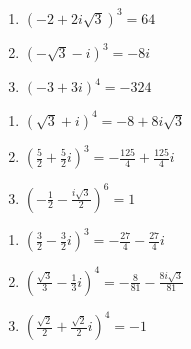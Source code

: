 \begin{multicols}{3}

\begin{enumerate}

\setcounter{enumi}{\value{HW}}

\item $\left(-2 + 2i\sqrt{3}\right)^3 = 64$
\item $(-\sqrt{3} - i)^3 =-8i$
\item $(-3+3i)^{4}=-324$

\setcounter{HW}{\value{enumi}}

\end{enumerate}

\end{multicols}

\begin{multicols}{3}

\begin{enumerate}

\setcounter{enumi}{\value{HW}}

\item $(\sqrt{3} + i)^4 =-8 + 8i\sqrt{3}$ 
\item $\left(\frac{5}{2} + \frac{5}{2} i\right)^3=-\frac{125}{4}+\frac{125}{4} i$ 
\item $\left(-\frac{1}{2} - \frac{i \sqrt{3}}{2}\right)^{6}=1$

\setcounter{HW}{\value{enumi}}

\end{enumerate}

\end{multicols}

\begin{multicols}{3}

\begin{enumerate}

\setcounter{enumi}{\value{HW}}

\item $\left(\frac{3}{2} - \frac{3}{2} i\right)^3=-\frac{27}{4}-\frac{27}{4} i$ 
\item $\left(\frac{\sqrt{3}}{3} - \frac{1}{3} i\right)^4 =-\frac{8}{81} - \frac{8i\sqrt{3}}{81}$
\item $\left(\frac{\sqrt{2}}{2} + \frac{\sqrt{2}}{2} i\right)^4=-1$

\setcounter{HW}{\value{enumi}}

\end{enumerate}

\end{multicols}

